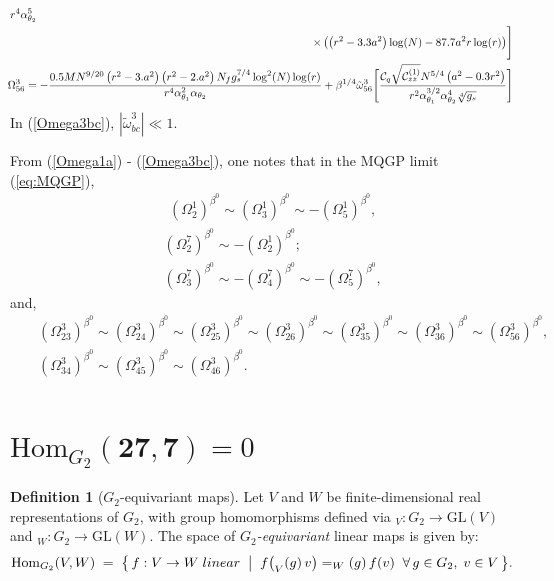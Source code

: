 \documentclass[a4paper,11pt,fleqn]{article}
\makeatletter
\theoremstyle{plain}
\theoremstyle{definition}
\newtheorem{definition}[theorem]{Definition}
\newcommand{\HomG}{\mathrm{Hom}_{G_2}}
\def\seceqbb{\@addtoreset{equation}{section}
\def\theequation{B\arabic{equation}}}
\makeatother
\begin{document}
{\begin{eqnarray}
{   }{r^4 \alpha _{\theta_2}^5}\nonumber\\
   & & \hskip -0.5in \times \left(\left(r^2-3.3 a^2\right) \log (N)-87.7 a^2 r \log (r)\right)\Biggr]\nonumber\\
   & & \hskip -0.5in \Omega^3_{56}=-\frac{0.5 M N^{9/20} \left(r^2-3. a^2\right) \left(r^2-2. a^2\right) N_f g_s^{7/4} \log ^2(N) \log (r)}{r^4 \alpha _{\theta_1}^2 \alpha _{\theta_2}}+\beta^{1/4}\tilde{\omega}^3_{56}\Biggl[\frac{ {\cal C}_q \sqrt{{\cal C}_{zz}^{(1)}} N^{5/4} \left(a^2-0.3 r^2\right)}{r^2 \alpha _{\theta_1}^{3/2} \alpha _{\theta_2}^4 \sqrt[4]{g_s}}\Biggr]\nonumber\\
\end{eqnarray}
}
In (\ref{Omega3bc}), $\left|\tilde{\omega}^3_{bc}\right|\ll1$.

From (\ref{Omega1a}) - (\ref{Omega3bc}), one notes that in the MQGP limit (\ref{eq:MQGP}),
\begin{eqnarray}
\label{similar-Omega^1_a-beta0}
& & \left(\Omega^1_2\right)^{\beta^0} \sim \left(\Omega^1_3\right)^{\beta^0} \sim
-\left(\Omega^1_5\right)^{\beta^0},
\end{eqnarray}
\begin{eqnarray}
\label{similar-Omega^7_a-beta0}
& & \left(\Omega^7_2\right)^{\beta^0} \sim - \left(\Omega^1_2\right)^{\beta^0};\nonumber\\
& & \left(\Omega^7_3\right)^{\beta^0} \sim - \left(\Omega^7_4\right)^{\beta^0} \sim
- \left(\Omega^7_5\right)^{\beta^0},
\end{eqnarray}
and,
\begin{eqnarray}
\label{similar-Omega^a_bc-beta0}
& & \left(\Omega^3_{23}\right)^{\beta^0} \sim \left(\Omega^3_{24}\right)^{\beta^0}
\sim \left(\Omega^3_{25}\right)^{\beta^0} \sim \left(\Omega^3_{26}\right)^{\beta^0}
\sim \left(\Omega^3_{35}\right)^{\beta^0} \sim \left(\Omega^3_{36}\right)^{\beta^0}
\sim \left(\Omega^3_{56}\right)^{\beta^0},\nonumber\\
& & \left(\Omega^3_{34}\right)^{\beta^0} \sim \left(\Omega^3_{45}\right)^{\beta^0} \sim \left(\Omega^3_{46}\right)^{\beta^0}.
\nonumber\\
\end{eqnarray}

\section{$\HomG(\mathbf{27},\mathbf{7}) = 0$}
\label{HomG27270}
\setcounter{equation}{0} \seceqbb

\begin{definition}[$G_2$-equivariant maps]
Let $V$ and $W$ be finite-dimensional real representations of $G_2$, with  group homomorphisms defined via
$_V:G_2\to\mathrm{GL}(V)$ and $_W:G_2\to\mathrm{GL}(W)$.
The space of \emph{$G_2$-equivariant} linear maps is given by:
\[
  \HomG(V,W)
  \;=\;
  \bigl\{\,f:V\to W\;{linear}\;\bigm|\;
    f\bigl(_V(g)\,v\bigr) = _W(g)\,f(v)
    \;\;\forall\,g\in G_2,\;v\in V
  \,\bigr\}.
\]
\end{definition}
\end{document}
